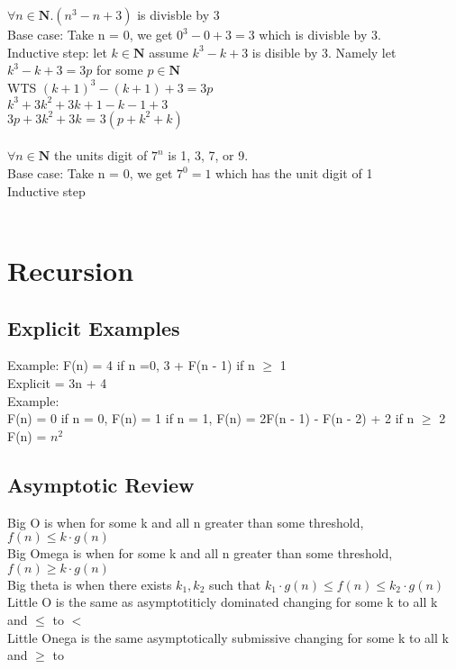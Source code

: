 \documentclass{article}
\begin{document}
$\forall n \in \mathbf{N}.(n^3 - n + 3)$ is divisble by 3 \\
Base case: Take n = 0, we get $0^3 - 0 +3 = 3$ which is divisble by 3.\\
Inductive step: let $k \in \mathbf{N}$ assume $k^3 - k +3 $ is disible by 3. Namely let $k^3 - k + 3 = 3p$ for some $p \in \mathbf{N}$\\
WTS $(k + 1)^3 - (k + 1) + 3  = 3p$\\
$k^3 + 3k^2 + 3k + 1 - k - 1 + 3$\\
$3p + 3k^2 + 3k$ = $3(p + k^2 + k)$\\ \\
$\forall n \in \mathbf{N}$ the units digit of $7^n$ is 1, 3, 7, or 9.\\
Base case: Take n = 0, we get $7^0 = 1$ which has the unit digit of 1\\
Inductive step \\ \\


\section{Recursion}
\subsection{Explicit Examples}
Example: F(n) = 4 if n =0, 3 + F(n - 1) if n $\geq$ 1\\
Explicit = 3n + 4\\

Example: \\
F(n) = 0 if n = 0, F(n) = 1 if n = 1, F(n) = 2F(n - 1) - F(n - 2) + 2 if n $\geq$ 2
\\
F(n) = $n^2$
\\
\subsection{Asymptotic Review}
Big O is when for some k and all n greater than some threshold, $f(n) \leq k \cdot g(n)$\\
Big Omega is when for some k and all n greater than some threshold, $f(n) \geq k \cdot g(n)$ \\
Big theta is when there exists $k_1, k_2$ such that $k_1 \cdot g(n) \leq f(n) \leq k_2 \cdot g(n)$\\
Little O is the same as asymptotiticly dominated changing for some k to all k and $\leq$ to $<$\\
Little Onega is the same asymptotically submissive changing for some k to all k and $\geq$ to $\>$\\
\end{document}
